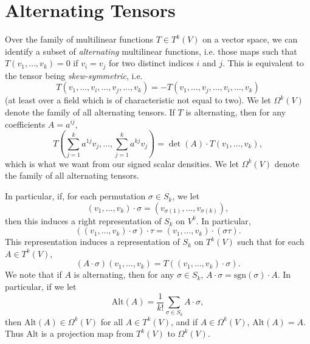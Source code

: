 \section{Alternating Tensors}

Over the family of multilinear functions $T \in T^k(V)$ on a vector space, we can identify a subset of \emph{alternating} multilinear functions, i.e. those maps such that $T(v_1, \dots, v_k) = 0$ if $v_i = v_j$ for two distinct indices $i$ and $j$. This is equivalent to the tensor being \emph{skew-symmetric}, i.e.
%
\[ T(v_1, \dots, v_i, \dots, v_j, \dots, v_k) = - T(v_1, \dots, v_j, \dots, v_i, \dots, v_k) \]
%
(at least over a field which is of characteristic not equal to two). We let $\Omega^k(V)$ denote the family of all alternating tensors. If $T$ is alternating, then for any coefficients $A = a^{ij}$,
%
\[ T \left(\sum_{j = 1}^k a^{1j} v_j, \dots, \sum_{j = 1}^k a^{kj} v_j \right) = \det(A) \cdot T(v_1, \dots, v_k), \]
%
which is what we want from our signed scalar densities. We let $\Omega^k(V)$ denote the family of all alternating tensors.

In particular, if, for each permutation $\sigma \in S_k$, we let
%
\[ (v_1, \dots, v_k) \cdot \sigma = (v_{\sigma(1)}, \dots, v_{\sigma(k)}), \]
%
then this induces a right representation of $S_k$ on $V^k$. In particular,
%
\[ ((v_1, \dots, v_k) \cdot \sigma) \cdot \tau = (v_1, \dots, v_k) \cdot (\sigma \tau). \]
%
This representation induces a representation of $S_k$ on $T^k(V)$ such that for each $A \in T^k(V)$,
%
\[ (A \cdot \sigma)(v_1, \dots, v_k) = T((v_1, \dots, v_k) \cdot \sigma). \]
%
We note that if $A$ is alternating, then for any $\sigma \in S_k$, $A \cdot \sigma = \text{sgn}(\sigma) \cdot A$. In particular, if we let
%
\[ \text{Alt}(A) = \frac{1}{k!} \sum_{\sigma \in S_k} A \cdot \sigma, \]
%
then $\text{Alt}(A) \in \Omega^k(V)$ for all $A \in T^k(V)$, and if $A \in \Omega^k(V)$, $\text{Alt}(A) = A$. Thus $\text{Alt}$ is a projection map from $T^k(V)$ to $\Omega^k(V)$.

